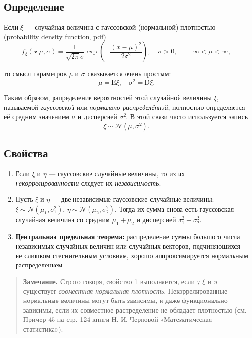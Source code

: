 \documentclass[11pt,a4paper]{article}
\begin{document}
\hypertarget{ux43eux43fux440ux435ux434ux435ux43bux435ux43dux438ux435}{%
\subsection{Определение}\label{ux43eux43fux440ux435ux434ux435ux43bux435ux43dux438ux435}}

Если \(\xi\) --- случайная величина с гауссовской (нормальной)
плотностью (probability density function, pdf) \[
  f_\xi(x|\mu,\sigma) = \frac{1}{\sqrt{2\pi}\sigma} \exp{ \left( -\frac{(x - \mu)^2}{2\sigma^2}\right)}, \quad \sigma>0, \quad -\infty < \mu < \infty,
\]

то смысл параметров \(\mu\) и \(\sigma\) оказывается очень простым: \[
  \mu = \mathrm{E} \xi, \quad \sigma^2 = \mathrm{D} \xi .
\]

Таким образом, рапределение вероятностей этой случайной величины
\(\xi\), называемой \emph{гауссовской} или \emph{нормально
распределённой}, полностью определяется её средним значением \(\mu\) и
дисперсией \(\sigma^2\). В этой связи часто используется запись \[
  \xi \sim \mathcal{N}\left( \mu, \sigma^2 \right).
\]

    \hypertarget{ux441ux432ux43eux439ux441ux442ux432ux430}{%
\subsection{Свойства}\label{ux441ux432ux43eux439ux441ux442ux432ux430}}

\begin{enumerate}
\def\labelenumi{\arabic{enumi}.}
\item
  Если \(\xi\) и \(\eta\) --- гауссовские случайные величины, то из их
  \emph{некоррелированности} следует их \emph{независимость}.
\item
  Пусть \(\xi\) и \(\eta\) --- две независимые гауссовские случайные
  величины: \(\xi \sim \mathcal{N}\left( \mu_1, \sigma_1^2 \right)\),
  \(\eta \sim \mathcal{N}\left( \mu_2, \sigma_2^2 \right)\). Тогда их
  сумма снова есть гауссовская случайная величина со средним
  \(\mu_1 + \mu_2\) и дисперсией \(\sigma_1^2 + \sigma_2^2\).
\item
  \textbf{Центральная предельная теорема:} распределение суммы большого
  числа независимых случайных величин или случайных векторов,
  подчиняющихся не слишком стеснительным условиям, хорошо
  аппроксимируется нормальным распределением.
\end{enumerate}

\begin{quote}
\textbf{Замечание.} Строго говоря, свойство 1 выполняется, если у
\(\xi\) и \(\eta\) существует \emph{совместная нормальная плотность}.
Некоррелированные нормальные величины могут быть зависимы, и даже
функционально зависимы, если их совместное распределение не обладает
плотностью (см. Пример 45 на стр. 124 книги Н. И. Черновой
«Математическая статистика»).
\end{quote}
\end{document}
